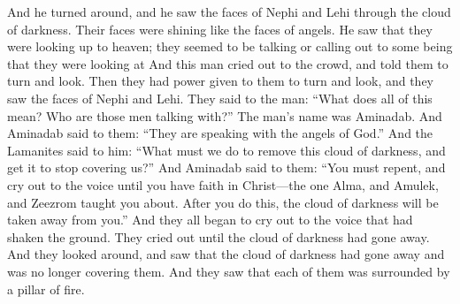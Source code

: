 And he turned around, and he saw the faces of Nephi and Lehi through the cloud of darkness. Their faces were shining like the faces of angels. He saw that they were looking up to heaven; they seemed to be talking or calling out to some being that they were looking at
\bverse \iffalse And it came to pass that this man did cry unto the multitude, that they might turn and look. And behold, there was power given unto them that they did turn and look; and they did behold the faces of Nephi and Lehi. \fi
And this man cried out to the crowd, and told them to turn and look. Then they had power given to them to turn and look, and they saw the faces of Nephi and Lehi.
\bverse \iffalse And they said unto the man: Behold, what do all these things mean, and who is it with whom these men do converse? \fi
They said to the man: ``What does all of this mean? Who are those men talking with?''
\bverse \iffalse Now the man's name was Aminadab. And Aminadab said unto them: They do converse with the angels of God. \fi
The man's name was Aminadab. And Aminadab said to them: ``They are speaking with the angels of God.''
\bverse \iffalse And it came to pass that the Lamanites said unto him: What shall we do, that this cloud of darkness may be removed from overshadowing us? \fi
And the Lamanites said to him: ``What must we do to remove this cloud of darkness, and get it to stop covering us?''
\bverse \iffalse And Aminadab said unto them: You must repent, and cry unto the voice, even until ye shall have faith in Christ, who was taught unto you by Alma, and Amulek, and Zeezrom; and when ye shall do this, the cloud of darkness shall be removed from overshadowing you. \fi
And Aminadab said to them: ``You must repent, and cry out to the voice until you have faith in Christ---the one Alma, and Amulek, and Zeezrom taught you about. After you do this, the cloud of darkness will be taken away from you.''
\bverse \iffalse And it came to pass that they all did begin to cry unto the voice of him who had shaken the earth; yea, they did cry even until the cloud of darkness was dispersed. \fi
And they all began to cry out to the voice that had shaken the ground. They cried out until the cloud of darkness had gone away.
\bverse \iffalse And it came to pass that when they cast their eyes about, and saw that the cloud of darkness was dispersed from overshadowing them, behold, they saw that they were encircled about, yea every soul, by a pillar of fire. \fi
And they looked around, and saw that the cloud of darkness had gone away and was no longer covering them. And they saw that each of them was surrounded by a pillar of fire.
